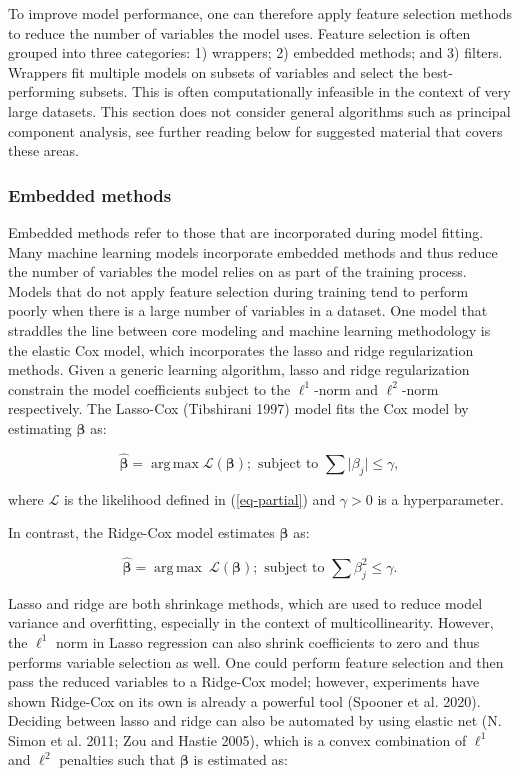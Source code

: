 \documentclass[
  letterpaper,
  krantz2]{style/krantz}
\begin{document}
To improve model performance, one can therefore apply feature selection
methods to reduce the number of variables the model uses.
 Feature selection
is often grouped into three categories: 1) wrappers; 2) embedded
methods; and 3) filters. Wrappers fit multiple models on subsets of
variables and select the best-performing subsets. This is often
computationally infeasible in the context of very large datasets. This
section does not consider general algorithms such as principal component
analysis, see further reading below for suggested material that covers
these areas.

\subsubsection{Embedded methods}\label{embedded-methods}

Embedded methods refer to those that are incorporated during model
fitting. Many machine learning models incorporate embedded methods and
thus reduce the number of variables the model relies on as part of the
training process. Models that do not apply feature selection during
training tend to perform poorly when there is a large number of
variables in a dataset. One model that straddles the line between core
modeling and machine learning methodology is the elastic Cox model,
which incorporates the lasso and ridge regularization methods. Given a
generic learning algorithm, lasso and ridge regularization constrain the
model coefficients subject to the \(\ell^1\)-norm and \(\ell^2\)-norm
respectively. The Lasso-Cox (Tibshirani 1997) model fits the Cox model
 by estimating \(\boldsymbol{\beta}\)
as: 

\[
\hat{\boldsymbol{\beta}} = \mathop{\mathrm{arg\,max}}\mathcal{L}(\boldsymbol{\beta}); \text{ subject to } \sum \vert \beta_j \vert \leq \gamma,
\]

where \(\mathcal{L}\) is the likelihood defined in (\ref{eq-partial})
and \(\gamma > 0\) is a hyperparameter.

In contrast, the Ridge-Cox model estimates \(\boldsymbol{\beta}\) as:

\[
\hat{\boldsymbol{\beta}} = \mathop{\mathrm{arg\,max}}\ \mathcal{L}(\boldsymbol{\beta}); \text{ subject to } \sum \beta_j^2 \leq \gamma.
\]

Lasso and ridge are both shrinkage methods, which are used to reduce
model variance and overfitting, especially in the context of
multicollinearity. However, the \(\ell^1\) norm in Lasso regression can
also shrink coefficients to zero and thus performs variable selection as
well. One could perform feature selection and then pass the reduced
variables to a Ridge-Cox model; however, experiments have shown
Ridge-Cox on its own is already a powerful tool (Spooner et al. 2020).
Deciding between lasso and ridge can also be automated by using elastic
net (N. Simon et al. 2011; Zou and Hastie 2005), which is a convex
combination of \(\ell^1\) and \(\ell^2\) penalties such that
\(\boldsymbol{\beta}\) is estimated as:
\end{document}
